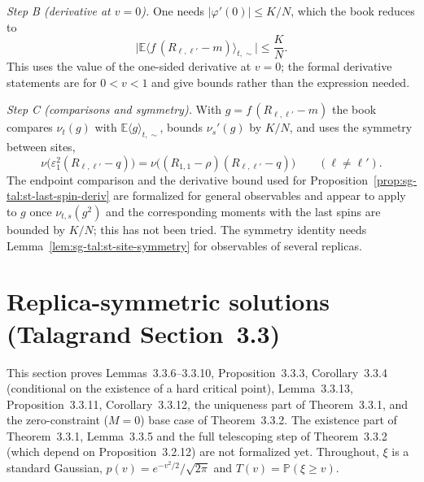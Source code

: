 \begin{remark}
\emph{Step B (derivative at $v=0$).} One needs $|\varphi'(0)|\le K/N$, which the book reduces to
\[
\bigl|\mathbb E\bigl\langle f\,(R_{\ell,\ell'}-m)\bigr\rangle_{t,\sim}\bigr|\le\frac KN .
\]
This uses the value of the one-sided derivative at $v=0$; the formal derivative statements are for $0<v<1$ and give
bounds rather than the expression needed.

\emph{Step C (comparisons and symmetry).} With $g=f\,(R_{\ell,\ell'}-m)$ the book compares $\nu_t(g)$ with
$\mathbb E\langle g\rangle_{t,\sim}$, bounds $\nu_s'(g)$ by $K/N$, and uses the symmetry between sites,
\[
\nu\bigl(\varepsilon_1^2(R_{\ell,\ell'}-q)\bigr)=\nu\bigl((R_{1,1}-\rho)(R_{\ell,\ell'}-q)\bigr)\qquad(\ell\ne\ell').
\]
The endpoint comparison and the derivative bound used for Proposition~\ref{prop:sg-tal:st-last-spin-deriv} are
formalized for general observables and appear to apply to $g$ once $\nu_{t,s}(g^2)$ and the corresponding moments
with the last spins are bounded by $K/N$; this has not been tried. The symmetry identity needs
Lemma~\ref{lem:sg-tal:st-site-symmetry} for observables of several replicas.
\end{remark}

\section{Replica-symmetric solutions (Talagrand Section~3.3)}
\label{sec:sg-tal:st-rs-bounds}

This section proves Lemmas~3.3.6--3.3.10, Proposition~3.3.3, Corollary~3.3.4 (conditional on the
existence of a hard critical point), Lemma~3.3.13, Proposition~3.3.11, Corollary~3.3.12, the uniqueness
part of Theorem~3.3.1, and the zero-constraint ($M=0$) base case of Theorem~3.3.2. The existence part of
Theorem~3.3.1, Lemma~3.3.5 and the full telescoping step of Theorem~3.3.2 (which depend on
Proposition~3.2.12) are not formalized yet.
Throughout, $\xi$ is a standard Gaussian, $p(v)=e^{-v^2/2}/\sqrt{2\pi}$ and
$T(v)=\mathbb P(\xi\ge v)$.

